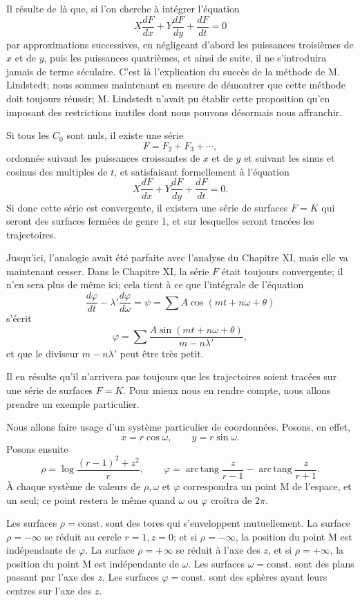 \documentclass[11pt]{article}
\begin{document}
Il résulte de là que, si l’on cherche à intégrer l’équation
\[
X\frac{dF}{dx}+Y\frac{dF}{dy}+\frac{dF}{dt}=0
\]
par approximations successives, en négligeant d’abord les puissances troisièmes de $x$ et de $y$, puis les puissances quatrièmes, et ainsi de suite, il ne s’introduira jamais de terme séculaire. C’est là l’explication du succès de la méthode de M. Lindstedt; nous sommes maintenant en mesure de démontrer que cette méthode doit toujours réussir; M. Lindstedt n’avait pu établir cette proposition qu’en imposant des restrictions inutiles dont nous pouvons désormais nous affranchir.

Si tous les $C_0$ sont nuls, il existe une série
\[
F=F_2+F_3+\cdots,
\]
ordonnée suivant les puissances croissantes de $x$ et de $y$ et suivant les sinus et cosinus des multiples de $t$, et satisfaisant formellement à l’équation
\[
X\frac{dF}{dx}+Y\frac{dF}{dy}+\frac{dF}{dt}=0.
\]
Si donc cette série est convergente, il existera une série de surfaces $F=K$ qui seront des surfaces fermées de genre 1, et sur lesquelles seront tracées les trajectoires.

Jusqu’ici, l’analogie avait été parfaite avec l’analyse du Chapitre XI, mais elle va maintenant cesser. Dans le Chapitre XI, la série $F$ était toujours convergente; il n’en sera plus de même ici; cela tient à ce que l’intégrale de l’équation
\begin{equation}
\frac{d\varphi}{dt}-\lambda'\frac{d\varphi}{d\omega}=\psi=\sum A\cos(mt+n\omega+\theta)
\tag{6 bis}
\end{equation}
s’écrit
\[
\varphi=\sum \frac{A\sin(mt+n\omega+\theta)}{m-n\lambda'},
\]
et que le diviseur $m-n\lambda'$ peut être très petit.

Il en résulte qu’il n’arrivera pas toujours que les trajectoires soient tracées sur une série de surfaces $F=K$. Pour mieux nous en rendre compte, nous allons prendre un exemple particulier.

Nous allons faire usage d’un système particulier de coordonnées. Posons, en effet,
\[
x=r\cos\omega,
\qquad
y=r\sin\omega.
\]
Posons ensuite
\[
\rho=\log\frac{(r-1)^2+z^2}{r},
\qquad
\varphi=\operatorname{arc\,tang}\frac{z}{r-1}
-\operatorname{arc\,tang}\frac{z}{r+1}.
\]
À chaque système de valeurs de $\rho,\omega$ et $\varphi$ correspondra un point M de l’espace, et un seul; ce point restera le même quand $\omega$ ou $\varphi$ croîtra de $2\pi$.

Les surfaces $\rho=\mathrm{const.}$ sont des tores qui s’enveloppent mutuellement. La surface $\rho=-\infty$ se réduit au cercle $r=1,z=0$; et si $\rho=-\infty$, la position du point M est indépendante de $\varphi$. La surface $\rho=+\infty$ se réduit à l’axe des $z$, et si $\rho=+\infty$, la position du point M est indépendante de $\omega$. Les surfaces $\omega=\mathrm{const.}$ sont des plans passant par l’axe des $z$. Les surfaces $\varphi=\mathrm{const.}$ sont des sphères ayant leurs centres sur l’axe des $z$.
\end{document}
